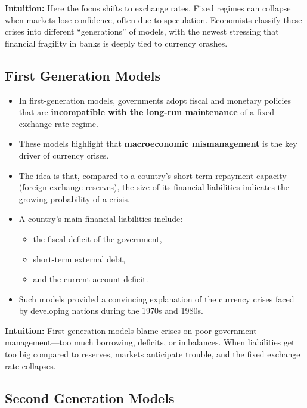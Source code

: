 \documentclass[12pt]{article}
\begin{document}
\textbf{Intuition:} Here the focus shifts to exchange rates. Fixed regimes can collapse when markets lose confidence, often due to speculation. Economists classify these crises into different “generations” of models, with the newest stressing that financial fragility in banks is deeply tied to currency crashes.

\subsection*{\noindent\textbf{First Generation Models}}

\begin{itemize}
    \item In first-generation models, governments adopt fiscal and monetary policies that are \textbf{incompatible with the long-run maintenance} of a fixed exchange rate regime.  
    \item These models highlight that \textbf{macroeconomic mismanagement} is the key driver of currency crises.  
    \item The idea is that, compared to a country’s short-term repayment capacity (foreign exchange reserves), the size of its financial liabilities indicates the growing probability of a crisis.  
    \item A country’s main financial liabilities include:  
    \begin{itemize}
        \item the fiscal deficit of the government,  
        \item short-term external debt,  
        \item and the current account deficit.  
    \end{itemize}
    \item Such models provided a convincing explanation of the currency crises faced by developing nations during the 1970s and 1980s.  
\end{itemize}

\textbf{Intuition:} First-generation models blame crises on poor government management—too much borrowing, deficits, or imbalances. When liabilities get too big compared to reserves, markets anticipate trouble, and the fixed exchange rate collapses.

\subsection*{\noindent\textbf{Second Generation Models}}
\end{document}
